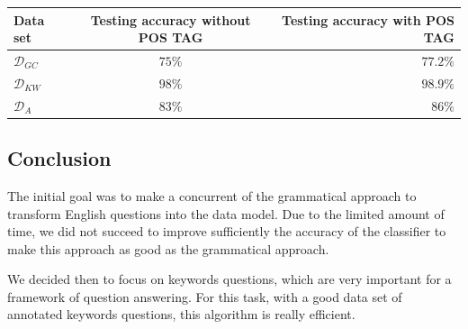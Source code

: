 \begin{center}
\begin{tabular}{|l|c|r|}
  \hline
  Data set & Testing accuracy  without POS TAG & Testing accuracy  with POS TAG \\
  \hline
  $\mathcal{D}_{GC}$ &  $75\%$& $77.2\%$  \\
  $\mathcal{D}_{KW}$ & $98\%$ & $98.9\%$ \\
  $\mathcal{D}_{A}$    & $83\%$ & $86\%$ \\
  \hline
\end{tabular}
\end{center}


\subsection{Conclusion}

The initial goal was to make a concurrent of the grammatical approach to transform English questions into the data model. Due to the limited amount of time, we did not succeed to improve sufficiently the accuracy of the classifier to make this approach as good as the grammatical approach.

We decided then to focus on keywords questions, which are very important for a framework of question answering. For this task, with a good data set of annotated keywords questions, this algorithm is really efficient.


